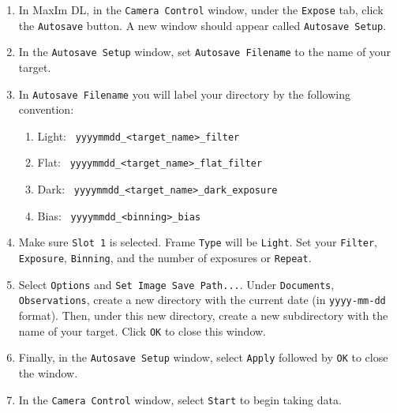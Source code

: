 \documentclass{article}
\begin{document}
	\begin{enumerate}
		
		\item In MaxIm DL, in the \texttt{Camera Control} window, under the \texttt{Expose} tab, click the \texttt{Autosave} button. A new window should appear called \texttt{Autosave Setup}.
		
		\item In the \texttt{Autosave Setup} window, set \texttt{Autosave Filename} to the name of your target.
		
		\item In \texttt{Autosave Filename} you will label your directory by the following convention:
		
		\begin{enumerate}
			
			\item Light: \ \texttt{yyyymmdd\_<target\_name>\_filter}
			
			\item Flat: \ \texttt{yyyymmdd\_<target\_name>\_flat\_filter}
			
			\item Dark: \ \texttt{yyyymmdd\_<target\_name>\_dark\_exposure}
			
			\item Bias: \ \texttt{yyyymmdd\_<binning>\_bias}
			
		\end{enumerate}
		
		\item Make sure \texttt{Slot 1} is selected. Frame \texttt{Type} will be \texttt{Light}. Set your \texttt{Filter}, \texttt{Exposure}, \texttt{Binning}, and the number of exposures or \texttt{Repeat}.
		
		\item Select \texttt{Options} and \texttt{Set Image Save Path...}. Under \texttt{Documents}, \texttt{Observations}, create a new directory with the current date (in \texttt{yyyy-mm-dd} format). Then, under this new directory, create a new subdirectory with the name of your target. Click \texttt{OK} to close this window.
		
		\item Finally, in the \texttt{Autosave Setup} window, select \texttt{Apply} followed by \texttt{OK} to close the window.
		
		\item In the \texttt{Camera Control} window, select \texttt{Start} to begin taking data.
		
	\end{enumerate}
	
\end{document}
